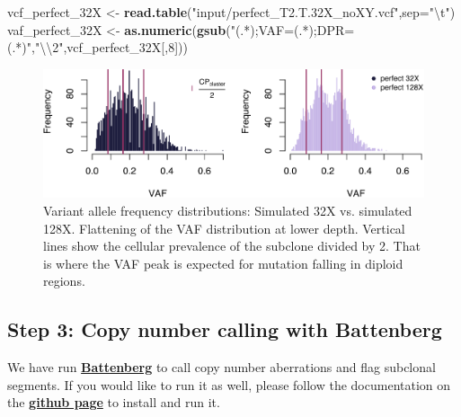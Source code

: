 \documentclass[]{article}
\newenvironment{Shaded}{\begin{snugshade}}{\end{snugshade}}
\newcommand{\CharTok}[1]{\textcolor[rgb]{0.31,0.60,0.02}{#1}}
\newcommand{\DataTypeTok}[1]{\textcolor[rgb]{0.13,0.29,0.53}{#1}}
\newcommand{\DecValTok}[1]{\textcolor[rgb]{0.00,0.00,0.81}{#1}}
\newcommand{\KeywordTok}[1]{\textcolor[rgb]{0.13,0.29,0.53}{\textbf{#1}}}
\newcommand{\NormalTok}[1]{#1}
\newcommand{\StringTok}[1]{\textcolor[rgb]{0.31,0.60,0.02}{#1}}
\begin{document}
\begin{Shaded}
\begin{Highlighting}[]
\NormalTok{vcf_perfect_32X <-}\StringTok{ }\KeywordTok{read.table}\NormalTok{(}\StringTok{"input/perfect_T2.T.32X_noXY.vcf"}\NormalTok{,}\DataTypeTok{sep=}\StringTok{"}\CharTok{\textbackslash{}t}\StringTok{"}\NormalTok{)}
\NormalTok{vaf_perfect_32X <-}\StringTok{ }\KeywordTok{as.numeric}\NormalTok{(}\KeywordTok{gsub}\NormalTok{(}\StringTok{"(.*);VAF=(.*);DPR=(.*)"}\NormalTok{,}\StringTok{"}\CharTok{\textbackslash{}\textbackslash{}}\StringTok{2"}\NormalTok{,vcf_perfect_32X[,}\DecValTok{8}\NormalTok{]))}
\end{Highlighting}
\end{Shaded}

\begin{figure}

{\centering \includegraphics{src_guide_files/figure-latex/fig1b-1} 

}

\caption{\label{fig1b}Variant allele frequency distributions: Simulated 32X vs. simulated 128X. Flattening of the VAF distribution at lower depth. Vertical lines show the cellular prevalence of the subclone divided by 2. That is where the VAF peak is expected for mutation falling in diploid regions.}\label{fig:fig1b}
\end{figure}

\newpage

\hypertarget{step-3-copy-number-calling-with-battenberg}{%
\subsection{Step 3: Copy number calling with
Battenberg}\label{step-3-copy-number-calling-with-battenberg}}

We have run
\href{https://github.com/Wedge-Oxford/battenberg}{\textbf{Battenberg}}
to call copy number aberrations and flag subclonal segments. If you
would like to run it as well, please follow the documentation on the
\href{https://github.com/Wedge-Oxford/battenberg}{\textbf{github page}}
to install and run it.
\end{document}
